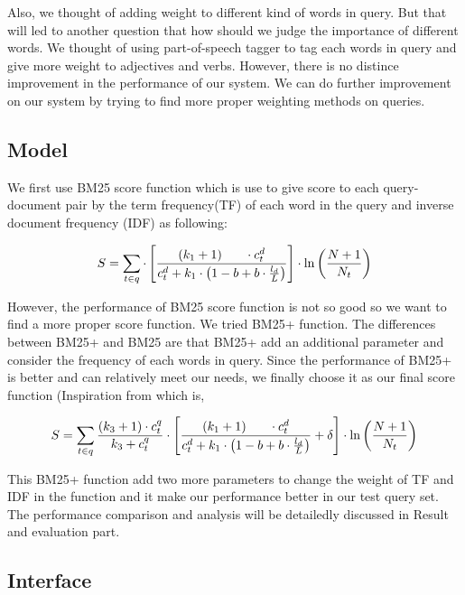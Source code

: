 \documentclass[sigconf,nonacm]{acmart}
\begin{document}
Also, we thought of adding weight to different kind of words in query. But that will led to another question that how should we judge the importance of different words. We thought of using part-of-speech tagger to tag each words in query and give more weight to adjectives and verbs. However, there is no distince improvement in the performance of our system. We can do further improvement on our system by trying to find more proper weighting methods on queries.

\subsection{Model}

We first use BM25 score function which is use to give score to each query-document pair by the term frequency(TF) of each word in the query and inverse document frequency (IDF) as following:

{
$$
  S = \sum_{t \in q} \cdot\left[\frac{\left(k_{1}+1\right) \\ \cdot c_{t}^{d}}{c_{t}^{d}+k_{1} \cdot\left(1-b+b \cdot \frac{l_{d}}{L}\right)}\right] \cdot \ln \left(\frac{N+1}{N_{t}}\right)
$$
}

However, the performance of BM25 score function is not so good so we want to find a more proper score function. We tried BM25+ function. The differences between BM25+ and BM25 are that BM25+ add an additional parameter and consider the frequency of each words in query. Since the performance of BM25+ is better and can relatively meet our needs, we finally choose it as our final score function  (Inspiration from \cite{yang2016reproducibility} which is,

{
\Small
$$
  S = \sum_{t \in q} \frac{\left(k_{3}+1\right) \cdot c_{t}^{q}}{k_{3}+c_{t}^{q}} \cdot\left[\frac{\left(k_{1}+1\right) \\ \cdot c_{t}^{d}}{c_{t}^{d}+k_{1} \cdot\left(1-b+b \cdot \frac{l_{d}}{L}\right)}+\delta\right] \cdot \ln \left(\frac{N+1}{N_{t}}\right)
$$
}


This BM25+ function add two more parameters to change the weight of TF and IDF in the function and it make our performance better in our test query set. The performance comparison and analysis will be detailedly discussed in Result and evaluation part.

\subsection{Interface}
\end{document}
